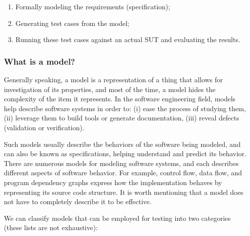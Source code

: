 \begin{enumerate}
\item Formally modeling the requirements (specification);

\item Generating test cases from the model;

\item Running these test cases against an actual SUT and
evaluating the results.
\end{enumerate}

\subsubsection{What is a model?}
\label{sec:related:testing:model}

Generally speaking, a model is a representation of a thing that
allows for investigation of its properties, and most of the time,
a model hides the complexity of the item it represents. In the
software engineering field, models help describe software systems
in order to: (i) ease the process of studying them, (ii) leverage
them to build tools or generate documentation, (iii) reveal
defects (validation or verification).

Such models usually describe the behaviors of the software being
modeled, and can also be known as specifications, helping
understand and predict its behavior. There are numerous models for
modeling software systems, and each describes different aspects
of software behavior. For example, control flow, data flow, and
program dependency graphs express how the implementation behaves
by representing its source code structure. It is worth mentioning
that a model does not have to completely describe it to be
effective.

We can classify models that can be employed for testing into two
categories (these lists are not exhaustive):

